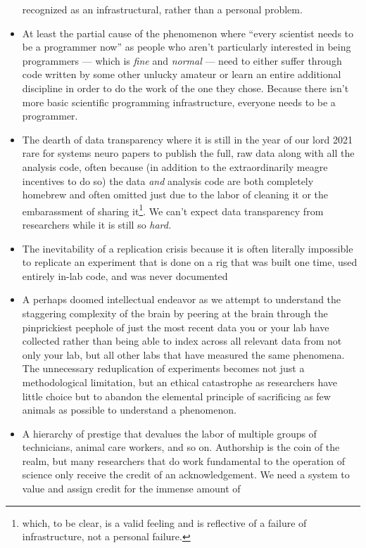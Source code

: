 \documentclass{article}
\begin{document}
\begin{itemize}
  recognized as an infrastructural, rather than a personal problem.
\item
  At least the partial cause of the phenomenon where ``every scientist
  needs to be a programmer now'' as people who aren't particularly
  interested in being programmers --- which is \emph{fine} and
  \emph{normal} --- need to either suffer through code written by some
  other unlucky amateur or learn an entire additional discipline in
  order to do the work of the one they chose. Because there isn't more
  basic scientific programming infrastructure, everyone needs to be a
  programmer.
\item
  The dearth of data transparency where it is still in the year of our
  lord 2021 rare for systems neuro papers to publish the full, raw data
  along with all the analysis code, often because (in addition to the
  extraordinarily meagre incentives to do so) the data \emph{and}
  analysis code are both completely homebrew and often omitted just due
  to the labor of cleaning it or the embarassment of sharing
  it\footnote{which, to be clear, is a valid feeling and is reflective
    of a failure of infrastructure, not a personal failure.}. We can't
  expect data transparency from researchers while it is still so
  \emph{hard.}
\item
  The inevitability of a replication crisis because it is often
  literally impossible to replicate an experiment that is done on a rig
  that was built one time, used entirely in-lab code, and was never
  documented
\item
  A perhaps doomed intellectual endeavor as we attempt to understand the staggering
  complexity of the brain by peering at the brain through the
  pinprickiest peephole of just the most recent data you or your lab
  have collected rather than being able to index across all relevant
  data from not only your lab, but all other labs that have measured the
  same phenomena. The unnecessary reduplication of experiments becomes
  not just a methodological limitation, but an ethical catastrophe as
  researchers have little choice but to abandon the elemental principle
  of sacrificing as few animals as possible to understand a phenomenon.
\item
  A hierarchy of prestige that devalues the labor of multiple groups of
  technicians, animal care workers, and so on. Authorship is the coin of
  the realm, but many researchers that do work fundamental to the
  operation of science only receive the credit of an acknowledgement. We
  need a system to value and assign credit for the immense amount of

\end{itemize}
\end{document}
